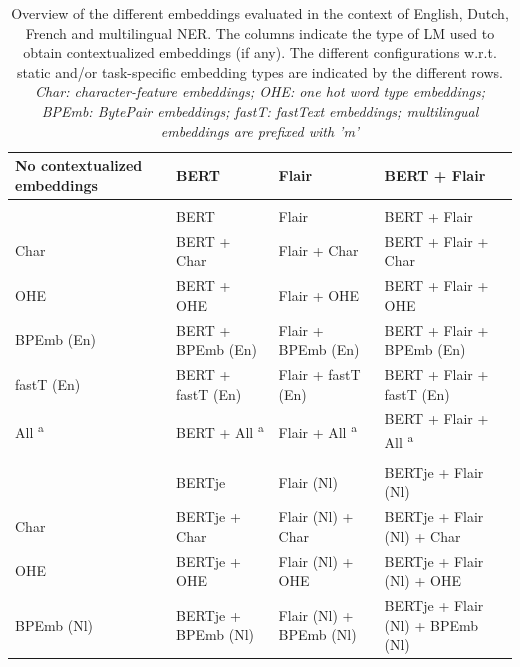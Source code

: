 \documentclass[12pt,a4paper,]{book}
\begin{document}
\begin{landscape}\begin{table}

\caption{\label{tab:embeddings}Overview of the different embeddings evaluated in the context of English, Dutch, French and multilingual NER. The columns indicate the type of LM used to obtain contextualized embeddings (if any). The different configurations w.r.t. static and/or task-specific embedding types are indicated by the different rows. \textit{Char: character-feature embeddings; OHE: one hot word type embeddings; BPEmb: BytePair embeddings; fastT: fastText embeddings; multilingual embeddings are prefixed with 'm'}}
\centering
\fontsize{9}{11}\selectfont
\begin{tabular}[t]{llll}
\toprule
No contextualized embeddings & BERT & Flair & BERT + Flair\\
\midrule
\addlinespace[0.3em]
\multicolumn{4}{l}{\textbf{English}}\\
\hspace{1em}\color{white}{n.a.} & BERT & Flair & BERT + Flair\\
\hspace{1em}Char & BERT + Char & Flair + Char & BERT + Flair + Char\\
\hspace{1em}OHE & BERT + OHE & Flair + OHE & BERT + Flair + OHE\\
\hspace{1em}BPEmb (En) & BERT + BPEmb (En) & Flair + BPEmb (En) & BERT + Flair + BPEmb (En)\\
\hspace{1em}fastT (En) & BERT + fastT (En) & Flair + fastT (En) & BERT + Flair + fastT (En)\\
\hspace{1em}All \textsuperscript{a} & BERT + All \textsuperscript{a} & Flair + All \textsuperscript{a} & BERT + Flair + All \textsuperscript{a}\\
\addlinespace[0.3em]
\multicolumn{4}{l}{\textbf{Dutch}}\\
\hspace{1em}\color{white}{n.a.} & BERTje & Flair (Nl) & BERTje + Flair (Nl)\\
\hspace{1em}Char & BERTje + Char & Flair (Nl) + Char & BERTje + Flair (Nl) + Char\\
\hspace{1em}OHE & BERTje + OHE & Flair (Nl) + OHE & BERTje + Flair (Nl) + OHE\\
\hspace{1em}BPEmb (Nl) & BERTje + BPEmb (Nl) & Flair (Nl) + BPEmb (Nl) & BERTje + Flair (Nl) + BPEmb (Nl)\\

\end{tabular}
\end{table}
\end{landscape}
\end{document}
